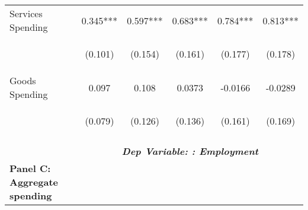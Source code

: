 \begin{tabular}{lccccc}
      
    Services Spending & 0.345*** & 0.597*** &         0.683*** &         0.784***   &       0.813*** \\
     & \begin{footnotesize}(0.101)\end{footnotesize} & \begin{footnotesize}(0.154)\end{footnotesize} & \begin{footnotesize}(0.161)\end{footnotesize} & \begin{footnotesize}(0.177)\end{footnotesize} & \begin{footnotesize}(0.178)\end{footnotesize} \\

    Goods Spending & 0.097 & 0.108 & 0.0373 & -0.0166 & -0.0289 \\
     & \begin{footnotesize}(0.079)\end{footnotesize} & \begin{footnotesize}(0.126)\end{footnotesize} & \begin{footnotesize}(0.136)\end{footnotesize} & \begin{footnotesize}(0.161)\end{footnotesize} & \begin{footnotesize}(0.169)\end{footnotesize} \\
    \hline
    \vspace{-2pt} & \vspace{-2pt} & \vspace{-2pt} & \vspace{-2pt} & \vspace{-2pt} \\
    & \multicolumn{5}{c}{\textit{\textbf{Dep Variable: : Employment}}} \\ 
    \cmidrule{2-6}
    
   \multicolumn{1}{l}{\textbf{Panel C: Aggregate spending}} & & & & \\


\end{tabular}
